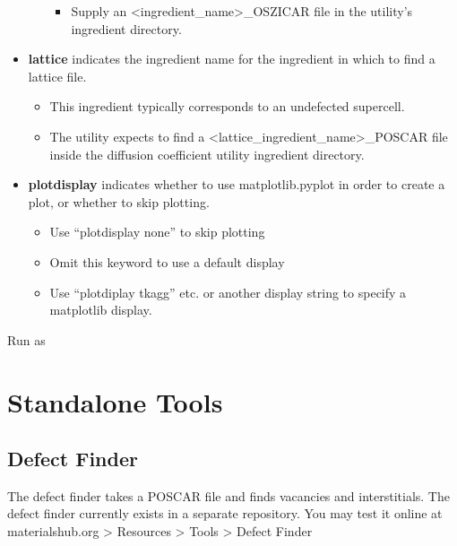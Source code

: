 \documentclass[letterpaper,10pt,english]{sphinxmanual}
\begin{document}
\begin{itemize}
\begin{itemize}
\begin{itemize}
\item {} 
Supply an \textless{}ingredient\_name\textgreater{}\_OSZICAR file in the utility's ingredient directory.

\end{itemize}

\end{itemize}

\item {} 
\textbf{lattice} indicates the ingredient name for the ingredient in which to find a lattice file.
\begin{itemize}
\item {} 
This ingredient typically corresponds to an undefected supercell.

\item {} 
The utility expects to find a \textless{}lattice\_ingredient\_name\textgreater{}\_POSCAR file inside the diffusion coefficient utility ingredient directory.

\end{itemize}

\item {} 
\textbf{plotdisplay} indicates whether to use matplotlib.pyplot in order to create a plot, or whether to skip plotting.
\begin{itemize}
\item {} 
Use ``plotdisplay none'' to skip plotting

\item {} 
Omit this keyword to use a default display

\item {} 
Use ``plotdiplay tkagg'' etc. or another display string to specify a matplotlib display.

\end{itemize}

\end{itemize}

Run as 


\chapter{Standalone Tools}
\label{8_0_standalonetools:standalone-tools}\label{8_0_standalonetools::doc}

\section{Defect Finder}
\label{8_0_standalonetools:defect-finder}
The defect finder takes a POSCAR file and finds vacancies and interstitials.
The defect finder currently exists in a separate repository.
You may test it online at materialshub.org \textgreater{} Resources \textgreater{} Tools \textgreater{} Defect Finder
\end{document}
